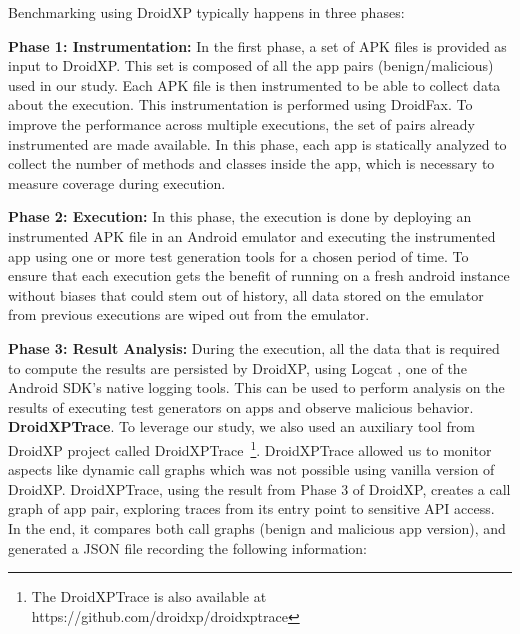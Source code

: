 Benchmarking using DroidXP typically happens in three phases:

\textbf{Phase 1: Instrumentation:} In the first phase, a set of APK files is provided as input to DroidXP. This set is composed of all the app pairs (benign/malicious) used in our study. Each APK file is then instrumented to be able to collect data about the execution. This instrumentation is performed using DroidFax. To improve the performance across multiple executions, the set of pairs already instrumented are made available. In this phase, each app is statically analyzed to collect the number of methods and classes inside the app, which is necessary to measure coverage during execution. %

\textbf{Phase 2: Execution:} In this phase, the execution is done by deploying an instrumented APK file in an Android emulator and executing the instrumented app using one or more test generation tools for a chosen period of time. To ensure that each execution gets the benefit of running on a fresh android instance without biases that could stem out of history, all data stored on the emulator from previous executions are wiped out from the emulator. 

\textbf{Phase 3: Result Analysis:} During the execution, all the data that is required to compute the results are persisted by DroidXP, using Logcat \cite{Logcat}, one of the Android SDK's native logging tools. This can be used to perform analysis on the results of executing test generators on apps and observe malicious behavior.\newline
\newline
\textbf{DroidXPTrace}. To leverage our study, we also used an auxiliary tool from DroidXP project called DroidXPTrace~\footnote{The DroidXPTrace is also available at https://github.com/droidxp/droidxptrace}. DroidXPTrace allowed us to monitor aspects like dynamic call graphs which was not possible using vanilla version of DroidXP. DroidXPTrace, using the result from Phase 3 of DroidXP, creates a call graph of app pair, exploring traces from its entry point to sensitive API access. In the end, it compares both call graphs (benign and malicious app version), and generated a JSON file recording the following information:

